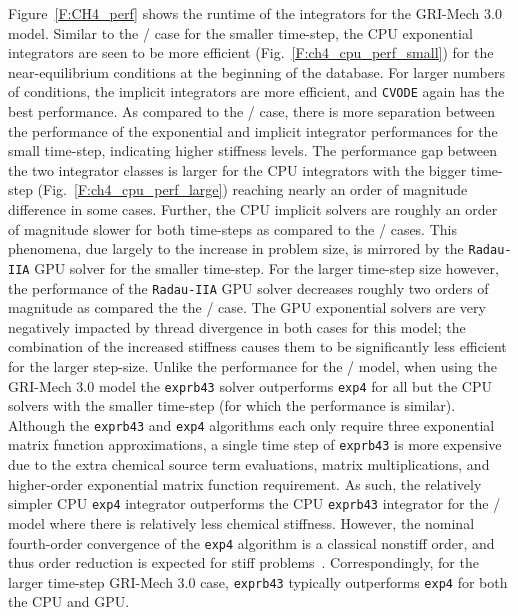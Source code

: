 \documentclass[final,twocolumn]{elsarticle}
\begin{document}
Figure~\ref{F:CH4_perf} shows the runtime of the integrators for the GRI-Mech 3.0 model.
Similar to the \slash{} case for the smaller time-step, the CPU exponential integrators are seen to be more efficient (Fig.~\ref{F:ch4_cpu_perf_small}) for the near-equilibrium conditions at the beginning of the database.
For larger numbers of conditions, the implicit integrators are more efficient, and \texttt{CVODE} again has the best performance.
As compared to the \slash{} case, there is more separation between the performance of the exponential and implicit integrator performances for the small time-step, indicating higher stiffness levels.
The performance gap between the two integrator classes is larger for the CPU integrators with the bigger time-step (Fig.~\ref{F:ch4_cpu_perf_large}) reaching nearly an order of magnitude difference in some cases.
Further, the CPU implicit solvers are roughly an order of magnitude slower for both time-steps as compared to the \slash{} cases.
This phenomena, due largely to the increase in problem size, is mirrored by the \texttt{Radau-IIA} GPU solver for the smaller time-step.
For the larger time-step size however, the performance of the \texttt{Radau-IIA} GPU solver decreases roughly two orders of magnitude as compared the the \slash{} case.
The GPU exponential solvers are very negatively impacted by thread divergence in both cases for this model; the combination of the increased stiffness causes them to be significantly less efficient for the larger step-size.
Unlike the performance for the \slash{} model, when using the GRI-Mech 3.0 model the \texttt{exprb43} solver outperforms \texttt{exp4} for all but the CPU solvers with the smaller time-step (for which the performance is similar).
Although the \texttt{exprb43} and \texttt{exp4} algorithms each only require three exponential matrix function approximations, a single time step of \texttt{exprb43} is more expensive due to the extra chemical source term evaluations, matrix multiplications, and higher-order exponential matrix function requirement.
As such, the relatively simpler CPU \texttt{exp4} integrator outperforms the CPU \texttt{exprb43} integrator for the \slash{} model where there is relatively less chemical stiffness.
However, the nominal fourth-order convergence of the \texttt{exp4} algorithm is a classical nonstiff order, and thus order reduction is expected for stiff problems~\cite{ANU:7701740,Bisetti:2012jw}.
Correspondingly, for the larger time-step GRI-Mech 3.0 case, \texttt{exprb43} typically outperforms \texttt{exp4} for both the CPU and GPU.
\end{document}
